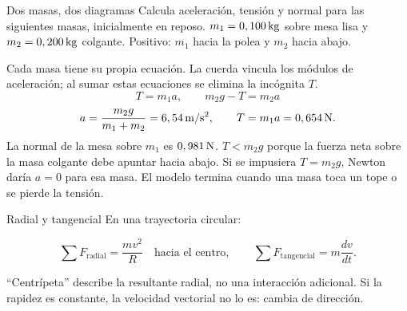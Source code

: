 \documentclass[11pt,a4paper]{article}
\begin{document}
\begin{examplebox}{Dos masas, dos diagramas}
 Calcula aceleraci\'on, tensi\'on y normal para las siguientes masas, inicialmente en reposo.
$m_1=0,100\,\mathrm{kg}$ sobre mesa lisa y $m_2=0,200\,\mathrm{kg}$ colgante. Positivo: $m_1$ hacia la polea y $m_2$ hacia abajo.
\solutionblock
\begin{center}
\end{center}
 Cada masa tiene su propia ecuaci\'on. La cuerda vincula los
m\'odulos de aceleraci\'on; al sumar estas ecuaciones se elimina la inc\'ognita $T$.
\[
T=m_1a,\qquad m_2g-T=m_2a
\]
\[
a=\frac{m_2g}{m_1+m_2}=6,54\,\mathrm{m/s^2},\qquad T=m_1a=0,654\,\mathrm{N}.
\]
 La normal de la mesa sobre $m_1$ es $0,981\,\mathrm{N}$. $T<m_2g$ porque la fuerza neta sobre la masa colgante debe apuntar hacia abajo.
Si se impusiera $T=m_2g$, Newton dar\'ia $a=0$ para esa masa.
El modelo termina cuando una masa toca un tope o se pierde la tensi\'on.
\end{examplebox}



\begin{lessoncard}{Radial y tangencial}
En una trayectoria circular:
\begin{formulabox}
\[
\sum F_{\mathrm{radial}}=\frac{mv^2}{R}\quad\text{hacia el centro},\qquad
\sum F_{\mathrm{tangencial}}=m\frac{dv}{dt}.
\]
\end{formulabox}
``Centr\'ipeta'' describe la resultante radial, no una interacci\'on adicional. Si la rapidez es constante, la velocidad vectorial no lo es: cambia de direcci\'on.
\end{lessoncard}
\end{document}

